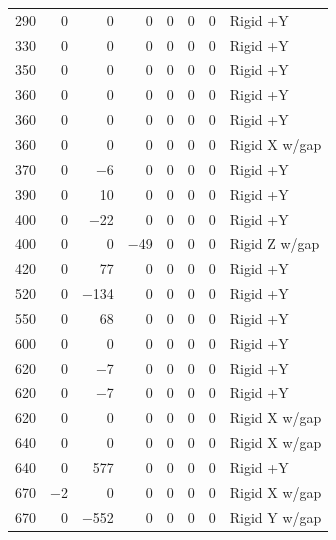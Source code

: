 \begin{longtable}{lrrrrrrl}
    290 & \num{0} & \num{0} & \num{0} & \num{0} & \num{0} & \num{0} & Rigid +Y \\
    330 & \num{0} & \num{0} & \num{0} & \num{0} & \num{0} & \num{0} & Rigid +Y \\
    350 & \num{0} & \num{0} & \num{0} & \num{0} & \num{0} & \num{0} & Rigid +Y \\
    360 & \num{0} & \num{0} & \num{0} & \num{0} & \num{0} & \num{0} & Rigid +Y \\
    360 & \num{0} & \num{0} & \num{0} & \num{0} & \num{0} & \num{0} & Rigid +Y \\
    360 & \num{0} & \num{0} & \num{0} & \num{0} & \num{0} & \num{0} & Rigid X w/gap \\
    370 & \num{0} & \num{-6} & \num{0} & \num{0} & \num{0} & \num{0} & Rigid +Y \\
    390 & \num{0} & \num{10} & \num{0} & \num{0} & \num{0} & \num{0} & Rigid +Y \\
    400 & \num{0} & \num{-22} & \num{0} & \num{0} & \num{0} & \num{0} & Rigid +Y \\
    400 & \num{0} & \num{0} & \num{-49} & \num{0} & \num{0} & \num{0} & Rigid Z w/gap \\
    420 & \num{0} & \num{77} & \num{0} & \num{0} & \num{0} & \num{0} & Rigid +Y \\
    520 & \num{0} & \num{-134} & \num{0} & \num{0} & \num{0} & \num{0} & Rigid +Y \\
    550 & \num{0} & \num{68} & \num{0} & \num{0} & \num{0} & \num{0} & Rigid +Y \\
    600 & \num{0} & \num{0} & \num{0} & \num{0} & \num{0} & \num{0} & Rigid +Y \\
    620 & \num{0} & \num{-7} & \num{0} & \num{0} & \num{0} & \num{0} & Rigid +Y \\
    620 & \num{0} & \num{-7} & \num{0} & \num{0} & \num{0} & \num{0} & Rigid +Y \\
    620 & \num{0} & \num{0} & \num{0} & \num{0} & \num{0} & \num{0} & Rigid X w/gap \\
    640 & \num{0} & \num{0} & \num{0} & \num{0} & \num{0} & \num{0} & Rigid X w/gap \\
    640 & \num{0} & \num{577} & \num{0} & \num{0} & \num{0} & \num{0} & Rigid +Y \\
    670 & \num{-2} & \num{0} & \num{0} & \num{0} & \num{0} & \num{0} & Rigid X w/gap \\
    670 & \num{0} & \num{-552} & \num{0} & \num{0} & \num{0} & \num{0} & Rigid Y w/gap \\

\end{longtable}
